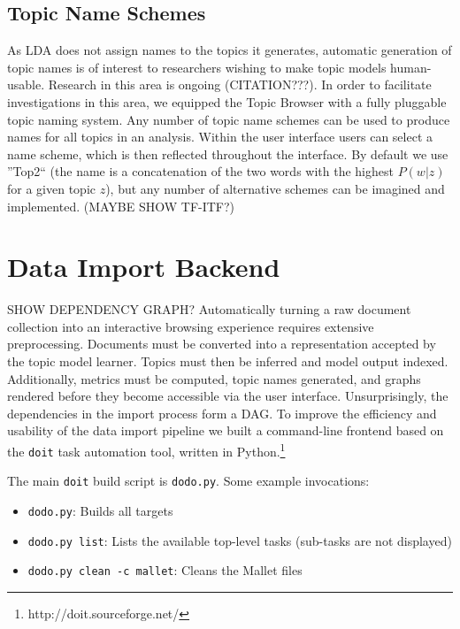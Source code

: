\subsection{Topic Name Schemes}
As LDA does not assign names to the topics it generates, automatic generation of
topic names is of interest to researchers wishing to make topic models
human-usable. Research in this area is ongoing (CITATION???). In order to
facilitate investigations in this area, we equipped the Topic Browser with a
fully pluggable topic naming system. Any number of topic name schemes can be
used to produce names for all topics in an analysis. Within the user interface
users can select a name scheme, which is then reflected throughout the
interface. By default we use ''Top2`` (the name is a concatenation of the two
words with the highest $P(w|z)$ for a given topic $z$), but any number of
alternative schemes can be imagined and implemented. (MAYBE SHOW TF-ITF?)

\section{Data Import Backend}
SHOW DEPENDENCY GRAPH?
Automatically turning a raw document collection into an interactive browsing
experience requires extensive preprocessing. Documents must be converted into a
representation accepted by the topic model learner. Topics must then be inferred
and model output indexed. Additionally, metrics must be computed, topic names
generated, and graphs rendered before they become accessible via the user
interface. Unsurprisingly, the dependencies in the import process form a DAG. To
improve the efficiency and usability of the data import pipeline we built a
command-line frontend based on the \verb/doit/ task automation tool, written in
Python.\footnote{http://doit.sourceforge.net/}

The main \verb/doit/ build script is \verb/dodo.py/. Some example invocations:
\begin{itemize}
 \item \verb/dodo.py/: Builds all targets
 \item \verb/dodo.py list/: Lists the available top-level tasks (sub-tasks are not displayed)
 \item \verb/dodo.py clean -c mallet/: Cleans the Mallet files
\end{itemize}

%

